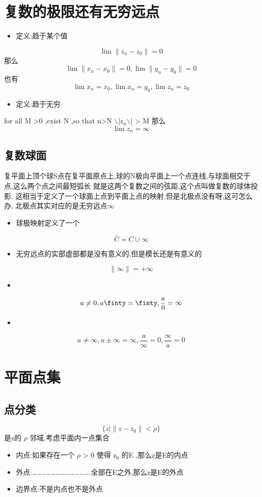 \documentclass[11pt]{article}
\author{MKQ}
\date{\today}
\title{}
\begin{document}
\tableofcontents

\section{复数的极限还有无穷远点}
\label{sec:org4923f7e}
\begin{itemize}
\item 定义:趋于某个值
\end{itemize}
\[ 
\lim \|z_n -z_0\| =0
\]
那么
\[
\lim \| x_n -x_0\| =0,\lim \| y_n -y_0\| =0
\]
也有
\[
\lim x_n=x_0,\lim x_n=y_0,\lim z_n=z_0
\]
\begin{itemize}
\item 定义:趋于无穷
\end{itemize}

for all M >0 ,exist N ,so that n>N $\backslash$|z\(_{\text{n}}\)$\backslash$| > M
那么
\[
\lim z_n =\infty
\]
\subsection{复数球面}
\label{sec:org13fd411}
复平面上顶个球S点在复平面原点上,球的N极向平面上一个点连线,与球面相交于点,这么两个点之间最短弧长
就是这两个复数之间的弦距,这个点叫做复数的球体投影,
这相当于定义了一个球面上点到平面上点的映射,但是北极点没有呀,这可怎么办,
北极点其实对应的是无穷远点\(\infty\)
\begin{itemize}
\item 球极映射定义了一个
\end{itemize}
\[
\bar{C}=C \cup {\infty}
\]
\begin{itemize}
\item 无穷远点的实部虚部都是没有意义的,但是模长还是有意义的
\end{itemize}
\[
\|\infty\|= + \infty
\]
\begin{itemize}
\item 
\end{itemize}
\[
a \neq 0, a\finty = \finty,\frac{a}{0}=\infty
\]
\begin{itemize}
\item 
\end{itemize}
\[
a \neq \infty ,a\pm \infty= \infty,\frac{a}{\infty}=0,\frac{\infty}{a}=0
\]
\section{平面点集}
\label{sec:orga41317d}
\subsection{点分类}
\label{sec:orgb7ce873}
\[\{z | \|z-z_0 \| <\rho \}\]
是z的 \(\rho\) 邻域,考虑平面内一点集合
\begin{itemize}
\item 内点:如果存在一个 \(\rho\) > 0 使得 z\(_{\text{0}}\) 的 E ,那么z是E的内点
\item 外点:\ldots{}\ldots{}\ldots{}\ldots{}\ldots{}\ldots{}\ldots{}\ldots{}\ldots{}\ldots{}\ldots{}\ldots{}.全部在E之外,那么z是E的外点
\item 边界点:不是内点也不是外点
\end{itemize}
\end{document}
